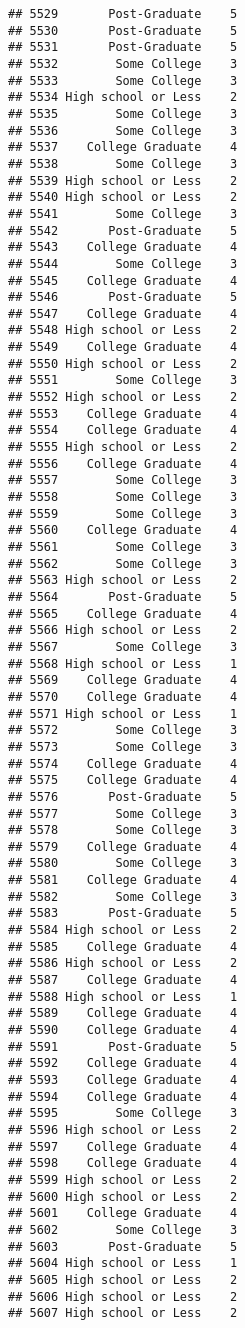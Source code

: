 \documentclass[
]{article}
\begin{document}
\begin{verbatim}
## 5529       Post-Graduate    5
## 5530       Post-Graduate    5
## 5531       Post-Graduate    5
## 5532        Some College    3
## 5533        Some College    3
## 5534 High school or Less    2
## 5535        Some College    3
## 5536        Some College    3
## 5537    College Graduate    4
## 5538        Some College    3
## 5539 High school or Less    2
## 5540 High school or Less    2
## 5541        Some College    3
## 5542       Post-Graduate    5
## 5543    College Graduate    4
## 5544        Some College    3
## 5545    College Graduate    4
## 5546       Post-Graduate    5
## 5547    College Graduate    4
## 5548 High school or Less    2
## 5549    College Graduate    4
## 5550 High school or Less    2
## 5551        Some College    3
## 5552 High school or Less    2
## 5553    College Graduate    4
## 5554    College Graduate    4
## 5555 High school or Less    2
## 5556    College Graduate    4
## 5557        Some College    3
## 5558        Some College    3
## 5559        Some College    3
## 5560    College Graduate    4
## 5561        Some College    3
## 5562        Some College    3
## 5563 High school or Less    2
## 5564       Post-Graduate    5
## 5565    College Graduate    4
## 5566 High school or Less    2
## 5567        Some College    3
## 5568 High school or Less    1
## 5569    College Graduate    4
## 5570    College Graduate    4
## 5571 High school or Less    1
## 5572        Some College    3
## 5573        Some College    3
## 5574    College Graduate    4
## 5575    College Graduate    4
## 5576       Post-Graduate    5
## 5577        Some College    3
## 5578        Some College    3
## 5579    College Graduate    4
## 5580        Some College    3
## 5581    College Graduate    4
## 5582        Some College    3
## 5583       Post-Graduate    5
## 5584 High school or Less    2
## 5585    College Graduate    4
## 5586 High school or Less    2
## 5587    College Graduate    4
## 5588 High school or Less    1
## 5589    College Graduate    4
## 5590    College Graduate    4
## 5591       Post-Graduate    5
## 5592    College Graduate    4
## 5593    College Graduate    4
## 5594    College Graduate    4
## 5595        Some College    3
## 5596 High school or Less    2
## 5597    College Graduate    4
## 5598    College Graduate    4
## 5599 High school or Less    2
## 5600 High school or Less    2
## 5601    College Graduate    4
## 5602        Some College    3
## 5603       Post-Graduate    5
## 5604 High school or Less    1
## 5605 High school or Less    2
## 5606 High school or Less    2
## 5607 High school or Less    2

\end{verbatim}
\end{document}
